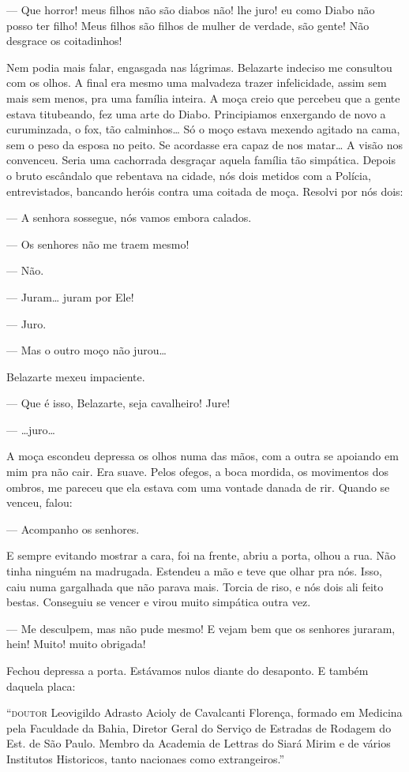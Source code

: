 --- Que horror! meus filhos não são diabos não! lhe juro! eu como Diabo
não posso ter filho! Meus filhos são filhos de mulher de verdade, são
gente! Não desgrace os coitadinhos!

Nem podia mais falar, engasgada nas lágrimas. Belazarte indeciso me
consultou com os olhos. A final era mesmo uma malvadeza trazer
infelicidade, assim sem mais sem menos, pra uma família inteira. A moça
creio que percebeu que a gente estava titubeando, fez uma arte do Diabo.
Principiamos enxergando de novo a curuminzada, o fox, tão calminhos\ldots{}
Só o moço estava mexendo agitado na cama, sem o peso da esposa no peito.
Se acordasse era capaz de nos matar\ldots{} A visão nos convenceu. Seria uma
cachorrada desgraçar aquela família tão simpática. Depois o bruto
escândalo que rebentava na cidade, nós dois metidos com a Polícia,
entrevistados, bancando heróis contra uma coitada de moça. Resolvi por
nós dois:

--- A senhora sossegue, nós vamos embora calados.

--- Os senhores não me traem mesmo!

--- Não.

--- Juram\ldots{} juram por Ele!

--- Juro.

--- Mas o outro moço não jurou\ldots{}

Belazarte mexeu impaciente.

--- Que é isso, Belazarte, seja cavalheiro! Jure!

--- \ldots{}juro\ldots{}

A moça escondeu depressa os olhos numa das mãos, com a outra se apoiando
em mim pra não cair. Era suave. Pelos ofegos, a boca mordida, os
movimentos dos ombros, me pareceu que ela estava com uma vontade danada
de rir. Quando se venceu, falou:

--- Acompanho os senhores.

E sempre evitando mostrar a cara, foi na frente, abriu a porta, olhou a
rua. Não tinha ninguém na madrugada. Estendeu a mão e teve que olhar pra
nós. Isso, caiu numa gargalhada que não parava mais. Torcia de riso, e
nós dois ali feito bestas. Conseguiu se vencer e virou muito simpática
outra vez.

--- Me desculpem, mas não pude mesmo! E vejam bem que os senhores
juraram, hein! Muito! muito obrigada!

Fechou depressa a porta. Estávamos nulos diante do desaponto. E também
daquela placa:

``\textsc{doutor} Leovigildo Adrasto Acioly de Cavalcanti Florença, formado em
Medicina pela Faculdade da Bahia, Diretor Geral do Serviço de Estradas
de Rodagem do Est. de São Paulo. Membro da Academia de Lettras do Siará
Mirim e de vários Institutos Historicos, tanto nacionaes como
extrangeiros.''

